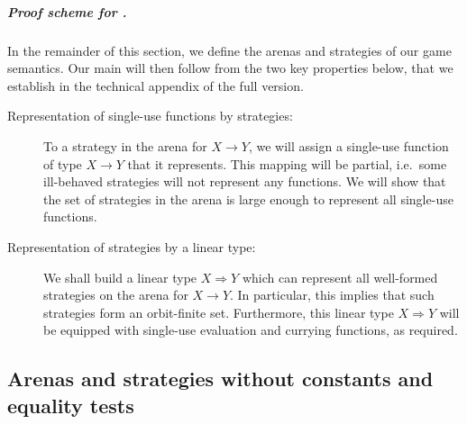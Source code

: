 \documentclass[a4paper,UKenglish,cleveref, autoref, numberwithinsect, thm-restate]{lipics-v2021}
\begin{document}
\subparagraph{Proof scheme for .}

In the remainder of this section, we define the arenas and strategies of our game semantics. Our main  will then follow from the two key properties below, that we establish in the technical appendix of the full version.
\begin{description}
    \item[Representation of single-use functions by strategies:] To a strategy in the arena for $X \to Y$, we will assign a single-use function of type $X \to Y$ that it represents. This mapping will be partial, i.e.~some ill-behaved strategies will not represent any functions. We will show that the set of strategies in the arena is large enough to represent all single-use functions.
    \item[Representation of strategies by a linear type:] We shall build a linear type $X \Rightarrow Y$ which can represent all well-formed strategies on the arena for $X\to Y$. In particular, this implies that such strategies form an orbit-finite set. Furthermore, this linear type $X\Rightarrow Y$ will be equipped with single-use evaluation and currying functions, as required.
\end{description}

\subsection{Arenas and strategies without constants and equality tests}
\label{sec:arenas-without-constants-and-equality-tests}
\end{document}
